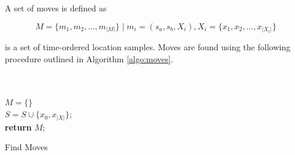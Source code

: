 A set of moves is defined as 

\begin{equation}
\label{eq:feature-moves}
M = \{m_1, m_2, ..., m_{|M|}\} \;| \; m_i = (s_a, s_b, X_i), X_i = \{x_1, x_2, ..., x_{|X_i|}\}
\end{equation}

is a set of time-ordered location samples. Moves are found using the following procedure outlined in Algorithm \ref{algo:moves}.

\begin{algorithm}[H]
\SetAlgoLined
{}\\
\\
    $M = \{ \}$\;\\
    $S = S \cup \{x_0, x_|X|\}$;\\
    \textbf{return} $M$;
 \label{algo:moves}
 \caption{Find Moves}
\end{algorithm}


